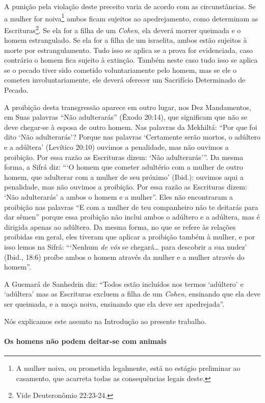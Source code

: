 A punição pela violação deste preceito varia de acordo com as
circunstâncias. Se a mulher for noiva\footnote{A mulher noiva, ou prometida legalmente, está no estágio preliminar ao casamento, que acarreta todas as consequências legais deste.} ambos ficam
sujeitos ao apedrejamento, como determinam as
Escrituras\footnote{Vide Deuteronômio 22:23-24.}. Se ela for a filha de um \textit{Cohen},
ela deverá morrer queimada e o homem estrangulado. Se ela for a filha de
um israelita, ambos estão sujeitos à morte por estrangulamento. Tudo
isso se aplica se a prova for evidenciada, caso contrário o homem fica
sujeito à extinção. Também neste caso tudo isso se aplica se o pecado
tiver sido cometido voluntariamente pelo homem, mas se ele o cometeu
involuntariamente, ele deverá oferecer um Sacrifício Determinado de
Pecado.

A proibição desta transgressão aparece em outro lugar, nos Dez
Mandamentos, em Suas palavras ``Não adulterarás'' (Êxodo 20:14), que
significam que não se deve chegar-se à esposa de outro homem. Nas
palavras da Mekhiltá: ``Por que foi dito `Não adulterarás'? Porque nas
palavras `Certamente serão mortos, o adúltero e a adúltera' (Levítico
20:10) ouvimos a penalidade, mas não ouvimos a proibição. Por essa razão
as Escrituras dizem: `Não adulterarás'''. Da mesma forma, a Sifrá diz:
```O homem que cometer adultério com a mulher de outro homem, que
adulterar com a mulher de seu próximo' (Ibid.): ouvimos aqui a
penalidade, mas não ouvimos a proibição. Por essa razão as Escrituras
dizem: `Não adulterarás' a ambos o homem e a mulher''. Eles não
encontraram a proibição nas palavras ``E com a mulher de teu
companheiro não te deitarás para dar sêmen'' porque essa proibição não
inclui ambos o adúltero e a adúltera, mas é dirigida apenas ao adúltero.
Da mesma forma, no que se refere às relações proibidas em geral, eles
tiveram que aplicar a proibição também à mulher, e por isso lemos na
Sifrá: ```Nenhum \emph{de vós} se chegará\ldots{} para descobrir a sua
nudez' (Ibid., 18:6) proíbe ambos o homem através da mulher e a mulher
através do homem''.

A Guemará de Sanhedrin diz: ``Todos estão incluídos nos termos
`adúltero' e `adúltera' mas as Escrituras excluem a filha de um \textit{Cohen},
ensinando que ela deve ser queimada, e a moça noiva, ensinando que ela
deve ser apedrejada''.

Nós explicamos este assunto na Introdução ao presente trabalho.


\paragraph{Os homens não podem deitar-se com animais}

